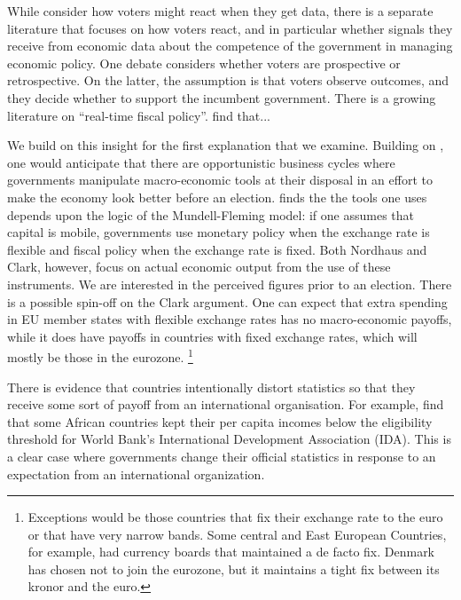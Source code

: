 \documentclass[]{article}
\begin{document}
While \cite{Hollyer2014} consider how voters might react when they get data, there is a separate literature that focuses on how voters react, and in particular whether signals they receive from economic data about the competence of the government in managing economic policy. One debate considers whether voters are prospective or retrospective. On the latter, the assumption is that voters observe outcomes, and they decide whether to support the incumbent government. There is a growing literature on ``real-time fiscal policy''. \cite{kayser_peress} find that...

We build on this insight for the first explanation that we examine. Building on \cite{nordhaus1975}, one would anticipate that there are opportunistic business cycles where governments manipulate macro-economic tools at their disposal in an effort to make the economy look better before an election. \cite{clark2003} finds the the tools one uses depends upon the logic of the Mundell-Fleming model: if one assumes that capital is mobile, governments use monetary policy when the exchange rate is flexible and fiscal policy when the exchange rate is fixed. Both Nordhaus and Clark, however, focus on actual economic output from the use of these instruments. We are interested in the perceived figures prior to an election. There is  a possible spin-off on the Clark argument. One can expect that extra spending in EU member states with flexible exchange rates has no macro-economic payoffs, while it does have payoffs in countries with fixed exchange rates, which will mostly be those in the eurozone. \footnote{Exceptions would be those countries that fix their exchange rate to the euro or that have very narrow bands. Some central and East European Countries, for example, had currency boards that maintained a de facto fix. Denmark has chosen not to join the eurozone, but it maintains a tight fix between its kronor and the euro.}

There is evidence that countries intentionally distort statistics so that they receive some sort of payoff from an international organisation. For example, \cite{kerner2016} find that some African countries kept their per capita incomes below the  eligibility threshold for World Bank’s International Development Association (IDA). This is a clear case where governments change their official statistics in response to an expectation from an international organization.
\end{document}
